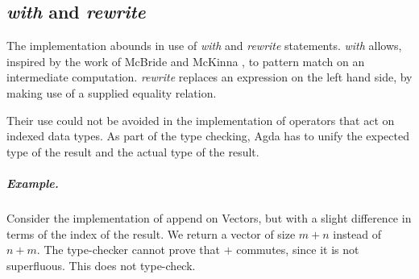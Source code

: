 \documentclass[12pt,twoside,notitlepage]{report}
\begin{document}
\subsection{\textit{with} and \textit{rewrite}}

The implementation abounds in use of \textit{with} and \textit{rewrite} statements. \textit{with} allows, inspired by the work of McBride and McKinna \cite{viewfromtheleft}, to pattern match on an intermediate computation. \textit{rewrite} replaces an expression on the left hand side, by making use of a supplied equality relation.

Their use could not be avoided in the implementation of operators that act on indexed data types. As part of the type checking, Agda has to unify the expected type of the result and the actual type of the result. 

\subparagraph{Example.} Consider the implementation of append on Vectors, but with a slight difference in terms of the index of the result. We return a vector of size $m + n$ instead of $n + m$. The type-checker cannot prove that  $+$ commutes, since it is not superfluous. This does not type-check.

\begin{code}
\\
\> \AgdaSymbol{:}  \AgdaSymbol{\{}  \AgdaSymbol{\}}  \AgdaSymbol{\{} \AgdaSymbol{:}  \AgdaSymbol{\}}\<%
\\
\>[4]\<[6]%
\>[6]   \<%
\\
\>[4]\<[6]%
\>[6]   \<%
\\
\>[4]\<[6]%
\>[6]   \AgdaSymbol{(} \AgdaPrimitive{+} \AgdaSymbol{)}\<%
\\
\> \AgdaInductiveConstructor{[]}  \AgdaSymbol{=} \<%
\\
\> \AgdaSymbol{(}  \AgdaSymbol{)}  \AgdaSymbol{=}     \<%
\\
\end{code}
\end{document}
